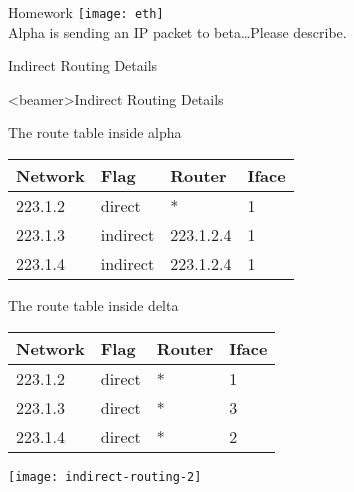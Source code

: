 \begin{frame}{Homework}
  \centering
  \texttt{[image: eth]}\\[2em]
  Alpha is sending an IP packet to beta\ldots{}Please describe.
\end{frame}
  
\begin{frame}{Indirect Routing Details}\label{indirect-routing-2}
  \centering
  \mode<beamer>{ \texttt{[image: indirect-routing-2]} }%
\end{frame}

\begin{frame}<beamer>{Indirect Routing Details}
  \begin{minipage}{.5\linewidth}
    \begin{iblock}{The route table inside alpha}
      {\small\ttfamily
        \begin{tabular}{llll}
          \toprule
          Network & Flag     & Router    & Iface \\\midrule
          223.1.2 & direct   & *         & 1         \\
          223.1.3 & indirect & 223.1.2.4 & 1         \\
          223.1.4 & indirect & 223.1.2.4 & 1         \\\bottomrule
        \end{tabular}}
    \end{iblock}
    \begin{iblock}{The route table inside delta}
      {\small\ttfamily
        \begin{tabular}{llll}
          \toprule
          Network & Flag     & Router    & Iface \\\midrule
          223.1.2 & direct   & *         & 1         \\
          223.1.3 & direct   & *         & 3         \\
          223.1.4 & direct   & *         & 2         \\\bottomrule
        \end{tabular}}
    \end{iblock}
  \end{minipage}\hfill
  \begin{minipage}{.45\linewidth}
    \texttt{[image: indirect-routing-2]}
  \end{minipage}
\end{frame}

